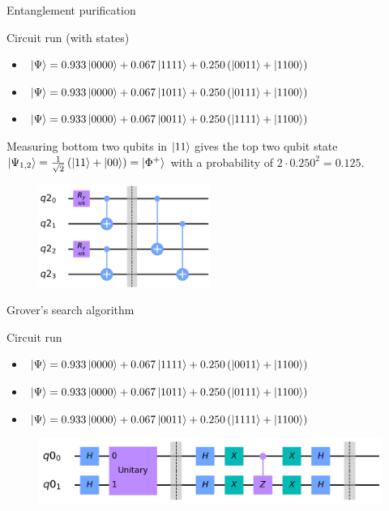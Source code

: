 \begin{frame}{Entanglement purification}
	
	\begin{block}{Circuit run (with states)}
		\begin{itemize}
			\item $\ket{\Psi} = 0.933\ket{0000}+0.067\ket{1111}
			+0.250\left(\ket{0011}+\ket{1100}\right)$
			\item $\ket{\Psi} = 0.933\ket{0000}+0.067\ket{1011}
			+0.250\left(\ket{0111}+\ket{1100}\right)$
			\item $\ket{\Psi} =
			0.933\ket{0000}+0.067\ket{0011} +0.250\left(\ket{1111}+\ket{1100}\right)$
		\end{itemize}
	\end{block}

Measuring bottom two qubits in $\ket{11}$ gives the top two qubit state
$\ket{\Psi_{1,2}} = \frac{1}{\sqrt{2}}\left(\ket{11} +\ket{00}\right) =
\ket{\Phi^+}$ with a probability of $2\cdot0.250^2 = 0.125$.
	
	\begin{figure}[h] \centering
		\includegraphics[width=0.5\textwidth]{images/purification_circuit.png}
		\label{fig:puri_circ}
	\end{figure}
	
\end{frame}

\begin{frame}{Grover's search algorithm}
		
	\begin{block}{Circuit run}
		\begin{itemize}
			\item $\ket{\Psi} = 0.933\ket{0000}+0.067\ket{1111}
			+0.250\left(\ket{0011}+\ket{1100}\right)$
			\item $\ket{\Psi} = 0.933\ket{0000}+0.067\ket{1011}
			+0.250\left(\ket{0111}+\ket{1100}\right)$
			\item $\ket{\Psi} =
			0.933\ket{0000}+0.067\ket{0011} +0.250\left(\ket{1111}+\ket{1100}\right)$
		\end{itemize}
	\end{block}
	

	\begin{figure}[h] \centering
		\includegraphics[width=\textwidth]{images/grover_circuit.png}
		\label{fig:grov_circ}
	\end{figure}
	
\end{frame}

